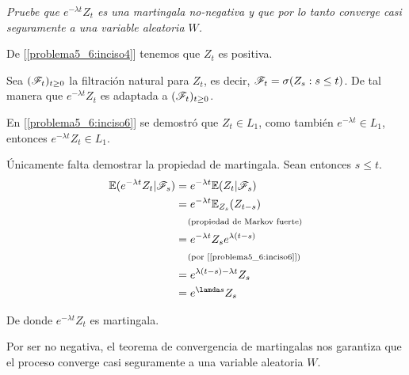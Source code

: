 \emph{
    Pruebe que $e^{-\lambda t}Z_t$ es una martingala no-negativa y que por lo tanto 
    converge casi seguramente a una variable aleatoria $W$.\pn
}

\afterstatement\pn

De [\ref{problema5_6:inciso4}] tenemos que $Z_t$ es positiva.

Sea $(\mathscr{F}_t)_{t \geq 0}$ la filtración natural para $Z_t$, es decir, $\mathscr{F}_t = \sigma(Z_s : s \leq t)$.
De tal manera que $e^{-\lambda t} Z_t$ es adaptada a $(\mathscr{F}_t)_{t \geq 0}$.\pn

En [\ref{problema5_6:inciso6}] se demostró que $Z_t \in L_1$, como también $e^{-\lambda t} \in L_1$,
entonces $e^{-\lambda t} Z_t \in L_1$.\pn

Únicamente falta demostrar la propiedad de martingala. Sean entonces $s \leq t$.
\begin{align}
        \E(e^{-\lambda t} Z_t | \F_s)   &=  e^{-\lambda t} \E( Z_t | \F_s)          \\
                                        &=  e^{-\lambda t} \E_{Z_s}(Z_{t-s})        \\
                                        &\comment{propiedad de Markov fuerte}       \\
                                        &=  e^{-\lambda t} Z_s e^{\lambda(t-s)}     \\
                                        &\comment{por [\ref{problema5_6:inciso6}]}  \\
                                        &=  e^{\lambda(t-s)-\lambda t} Z_s          \\
                                        &=  e^{\lamda s} Z_s                        \\
\end{align}\pn

De donde $e^{-\lambda t} Z_t$ es martingala.\pn

Por ser no negativa, el teorema de convergencia de martingalas nos garantiza que el proceso converge casi
seguramente a una variable aleatoria $W$.